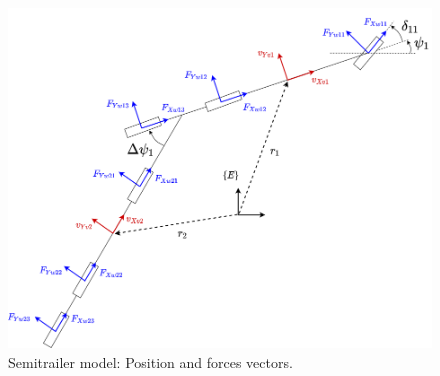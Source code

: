 \documentclass[12pt]{article}
\begin{document}
\begin{figure}[H]
    \centering
    \includegraphics[scale=0.5]{images/semitrailer_modelling_forces.png}
    \caption{Semitrailer model: Position and forces vectors.}
    \label{semitrailer_system_forces}
\end{figure}
\end{document}
